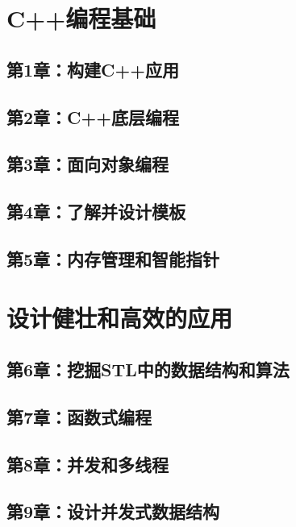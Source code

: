 \documentclass[11pt,a4paper,UTF8]{ctexart}
\begin{document}
	\section{C++编程基础}
	
		\subsection{第1章：构建C++应用}
		
		\subsection{第2章：C++底层编程}
		
		\subsection{第3章：面向对象编程}
		
		\subsection{第4章：了解并设计模板}
		
		\subsection{第5章：内存管理和智能指针}
		
	\section{设计健壮和高效的应用}
	
		\subsection{第6章：挖掘STL中的数据结构和算法}
		
		\subsection{第7章：函数式编程}
		
		\subsection{第8章：并发和多线程}
		
		\subsection{第9章：设计并发式数据结构}
		
\end{document}

